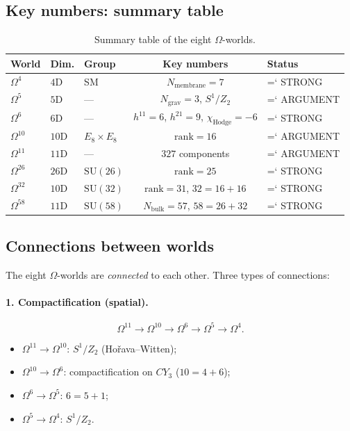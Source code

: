 \documentclass[11pt,a4paper]{article}
\newcommand{\SU}{\mathrm{SU}}
\newcommand{\CY}{CY_3}
\newcommand{\Om}{\Omega^4}
\newcommand{\Omf}{\Omega^5}
\newcommand{\Oms}{\Omega^6}
\newcommand{\Omt}{\Omega^{10}}
\newcommand{\Ome}{\Omega^{11}}
\newcommand{\Omtw}{\Omega^{26}}
\newcommand{\Omth}{\Omega^{32}}
\newcommand{\Omfi}{\Omega^{58}}
\newcommand{\Nbulk}{N_{\text{bulk}}}
\newcommand{\Nmembrane}{N_{\text{membrane}}}
\renewcommand{\texttt}[1]{{\ttfamily\hyphenchar\font=`\- #1}}
\theoremstyle{definition}
\begin{document}
\subsection{Key numbers: summary table}
\label{subsec:key-numbers-worlds}

\begin{table}[htbp]
\centering
\caption{Summary table of the eight $\Omega$-worlds.}
\label{tab:eight-worlds}
\begin{tabular}{lllcl}
\toprule
World & Dim. & Group & Key numbers & Status \\
\midrule
$\Om$ & $4$D & SM & $\Nmembrane = 7$ & \texttt{STRONG} \\
$\Omf$ & $5$D & --- & $N_{\text{grav}} = 3$, $S^1/Z_2$ & \texttt{ARGUMENT} \\
$\Oms$ & $6$D & --- & $h^{11}=6$, $h^{21}=9$, $\chi_{\text{Hodge}}=-6$ & \texttt{STRONG} \\
$\Omt$ & $10$D & $E_8 \times E_8$ & $\mathrm{rank} = 16$ & \texttt{ARGUMENT} \\
$\Ome$ & $11$D & --- & $327$ components & \texttt{ARGUMENT} \\
$\Omtw$ & $26$D & $\SU(26)$ & $\mathrm{rank} = 25$ & \texttt{STRONG} \\
$\Omth$ & $10$D & $\SU(32)$ & $\mathrm{rank} = 31$, $32 = 16+16$ & \texttt{STRONG} \\
$\Omfi$ & $11$D & $\SU(58)$ & $\Nbulk = 57$, $58 = 26+32$ & \texttt{STRONG} \\
\bottomrule
\end{tabular}
\end{table}

\subsection{Connections between worlds}
\label{subsec:connections}

The eight $\Omega$-worlds are \emph{connected} to each other. Three types of connections:

\paragraph{1. Compactification (spatial).}
\begin{equation}
    \Ome \to \Omt \to \Oms \to \Omf \to \Om.
\end{equation}
\begin{itemize}
    \item $\Ome \to \Omt$: $S^1/Z_2$ (Hořava--Witten);
    \item $\Omt \to \Oms$: compactification on $\CY$ ($10 = 4 + 6$);
    \item $\Oms \to \Omf$: $6 = 5 + 1$;
    \item $\Omf \to \Om$: $S^1/Z_2$.
\end{itemize}
\end{document}

